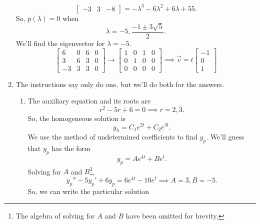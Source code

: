 \begin{enumerate}[label=\arabic*.]
\begin{equation*}
\begin{bmatrix}
				-3 & 3 & -8
			\end{bmatrix} = -\lambda^3 - 6\lambda^2 + 6\lambda + 55.
		\end{equation*}
		So, $p(\lambda) = 0$ when
		\begin{equation*}
			\lambda = -5, \frac{-1 \pm 3\sqrt{5}}{2}.
		\end{equation*}
		We'll find the eigenvector for $\lambda = -5$.
		\begin{equation*}
			\left[
				\begin{array}{ccc|c}
					6 & 0 & 6 & 0\\
					3 & 6 & 3 & 0\\
					-3 & 3 & 3 & 0
				\end{array}
			\right] \to \left[
				\begin{array}{ccc|c}
					1 & 0 & 1 & 0 \\
					0 & 1 & 0 & 0 \\
					0 & 0 & 0 & 0
				\end{array}
			\right] \implies \vec{v} = t\begin{bmatrix}
				-1 \\
				0 \\
				1
			\end{bmatrix}
		\end{equation*}
	\item
		The instructions say only do one, but we'll do both for the answers.
		\begin{enumerate}[label=(\alph*)]
			\item
				The auxiliary equation and its roots are
				\begin{equation*}
					r^2 - 5r + 6 = 0 \implies r = 2, 3.
				\end{equation*}
				So, the homogeneous solution is
				\begin{equation*}
					y_h = C_1e^{2t} + C_2e^{3t}.
				\end{equation*}
				We use the method of undetermined coefficients to find $y_p$.
				We'll guess that $y_p$ has the form
				\begin{equation*}
					y_p = Ae^{4t} + Be^{t}.
				\end{equation*}
				Solving for $A$ and $B$\footnote{The algebra of solving for $A$ and $B$ have been omitted for brevity.},
				\begin{equation*}
					y_p'' - 5y_p' + 6y_p = 6e^{4t} - 10e^t \implies A = 3, B = -5.
				\end{equation*}
				So, we can write the particular solution
				\begin{equation*}

\end{equation*}
\end{enumerate}
\end{enumerate}

